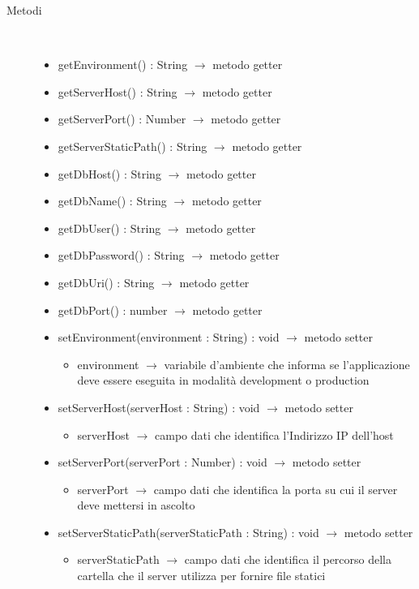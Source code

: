 \begin{description}
\item[Metodi] \hfill \\
\vspace{-7mm}
\begin{itemize}
	\item getEnvironment() : String $\rightarrow$ metodo getter
	\item getServerHost() : String $\rightarrow$ metodo getter
	\item getServerPort() : Number $\rightarrow$ metodo getter
	\item getServerStaticPath() : String $\rightarrow$ metodo getter
	\item getDbHost() : String $\rightarrow$ metodo getter
	\item getDbName() : String $\rightarrow$ metodo getter
	\item getDbUser() : String $\rightarrow$ metodo getter
	\item getDbPassword() : String $\rightarrow$ metodo getter
	\item getDbUri() : String $\rightarrow$ metodo getter
	\item getDbPort() : number $\rightarrow$ metodo getter
	\item setEnvironment(environment : String) : void $\rightarrow$ metodo setter\begin{itemize}
		\item environment $\rightarrow$ variabile d'ambiente che informa se l'applicazione deve essere eseguita in modalità development o production
	\end{itemize}
	
	\item setServerHost(serverHost : String) : void $\rightarrow$ metodo setter\begin{itemize}
		\item serverHost $\rightarrow$ campo dati che identifica l'Indirizzo IP dell'host
	\end{itemize}
	
	\item setServerPort(serverPort : Number) : void $\rightarrow$ metodo setter\begin{itemize}
		\item serverPort $\rightarrow$ campo dati che identifica la porta su cui il server deve mettersi in ascolto
	\end{itemize}
	
	\item setServerStaticPath(serverStaticPath : String) : void $\rightarrow$ metodo setter\begin{itemize}
		\item serverStaticPath $\rightarrow$ campo dati che identifica il percorso della cartella che il server utilizza per fornire file statici
	\end{itemize}
	

\end{itemize}
\end{description}
